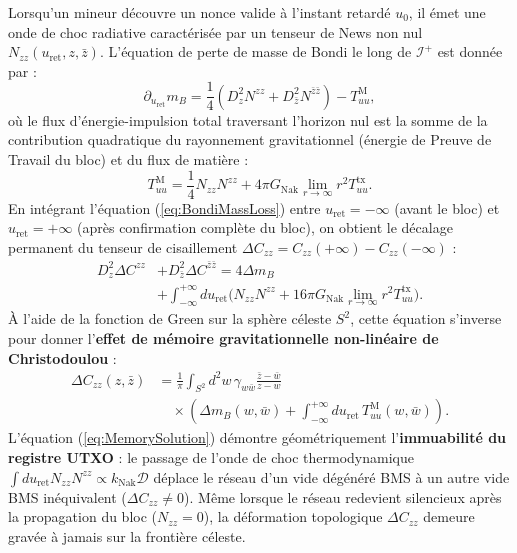 \documentclass[10pt,twocolumn,a4paper]{article}
\theoremstyle{plain}
\theoremstyle{definition}
\theoremstyle{remark}
\newcommand{\kNak}{k_{\text{Nak}}}
\newcommand{\GNak}{G_{\text{Nak}}}
\newcommand{\scri}{\mathcal{I}}
\newcommand{\uRet}{u_{\text{ret}}}
\begin{document}
Lorsqu'un mineur découvre un nonce valide à l'instant retardé $u_0$, il émet une onde de choc radiative caractérisée par un tenseur de News non nul $N_{zz}(\uRet, z, \bar{z})$. L'équation de perte de masse de Bondi le long de $\scri^+$ est donnée par :
\begin{equation}
    \partial_{\uRet} m_B = \frac{1}{4} \left( D_z^2 N^{zz} + D_{\bar{z}}^2 N^{\bar{z}\bar{z}} \right) - T_{uu}^{\text{M}},
    \label{eq:BondiMassLoss}
\end{equation}
où le flux d'énergie-impulsion total traversant l'horizon nul est la somme de la contribution quadratique du rayonnement gravitationnel (énergie de Preuve de Travail du bloc) et du flux de matière :
\begin{equation}
    T_{uu}^{\text{M}} = \frac{1}{4} N_{zz} N^{zz} + 4\pi \GNak \lim_{r\to\infty} r^2 T_{uu}^{\text{tx}}.
    \label{eq:TotalFlux}
\end{equation}
En intégrant l'équation (\ref{eq:BondiMassLoss}) entre $\uRet = -\infty$ (avant le bloc) et $\uRet = +\infty$ (après confirmation complète du bloc), on obtient le décalage permanent du tenseur de cisaillement $\Delta C_{zz} = C_{zz}(+\infty) - C_{zz}(-\infty)$ :
\begin{equation}
\begin{split}
    D_z^2 \Delta C^{zz} &+ D_{\bar{z}}^2 \Delta C^{\bar{z}\bar{z}} = 4 \Delta m_B \\
    &+ \int_{-\infty}^{+\infty} d\uRet \Big( N_{zz} N^{zz} + 16\pi\GNak \lim_{r\to\infty} r^2 T_{uu}^{\text{tx}} \Big).
\end{split}
\label{eq:ChristodoulouMemory}
\end{equation}
À l'aide de la fonction de Green sur la sphère céleste $S^2$, cette équation s'inverse pour donner l'\textbf{effet de mémoire gravitationnelle non-linéaire de Christodoulou} :
\begin{equation}
\begin{split}
    \Delta C_{zz}(z, \bar{z}) &= \frac{1}{\pi} \int_{S^2} d^2w \, \gamma_{w\bar{w}} \frac{\bar{z} - \bar{w}}{z - w} \\
    &\quad \times \left( \Delta m_B(w, \bar{w}) + \int_{-\infty}^{+\infty} d\uRet \, T_{uu}^{\text{M}}(w, \bar{w}) \right).
\end{split}
\label{eq:MemorySolution}
\end{equation}
L'équation (\ref{eq:MemorySolution}) démontre géométriquement l'\textbf{immuabilité du registre UTXO} : le passage de l'onde de choc thermodynamique $\int d\uRet N_{zz} N^{zz} \propto \kNak \mathcal{D}$ déplace le réseau d'un vide dégénéré BMS à un autre vide BMS inéquivalent ($\Delta C_{zz} \neq 0$). Même lorsque le réseau redevient silencieux après la propagation du bloc ($N_{zz} = 0$), la déformation topologique $\Delta C_{zz}$ demeure gravée à jamais sur la frontière céleste.
\end{document}
